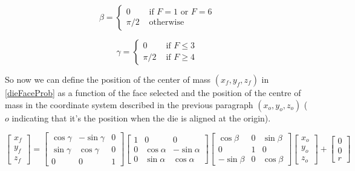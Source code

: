 \documentclass[english,12pt,a4paper,final]{article}
\begin{document}
\begin{equation*}
	\beta = \begin{cases} 
		0 & \text{ if } F = 1 \text{ or } F = 6 \\
		\pi/2 & \text{ otherwise }
	\end{cases}
\end{equation*}

\begin{equation*}
	\gamma = \begin{cases} 
		0 & \text{ if } F \le 3 \\
		\pi/2 & \text{ if } F \ge 4
	\end{cases}
\end{equation*}	

So now we can define the position of the center of mass $(x_f, y_f, z_f)$ in \eqref{dieFaceProb} as a function of the face selected and the position of the centre of mass in the coordinate system described in the previous paragraph $(x_o, y_o, z_o)$ ($o$ indicating that it's the position when the die is aligned at the origin).

\begin{equation*}
	\begin{bmatrix}
		x_f \\ y_f \\ z_f
	\end{bmatrix}
	=
	\begin{bmatrix}
		\cos\gamma & -\sin\gamma & 0 \\
		\sin\gamma & \cos\gamma & 0 \\
		0 & 0 & 1
	\end{bmatrix}
	\begin{bmatrix}
		1 & 0 & 0 \\
		0 & \cos\alpha & -\sin\alpha \\
		0 & \sin\alpha & \cos\alpha
	\end{bmatrix}
	\begin{bmatrix}
		\cos\beta & 0 & \sin\beta \\
		0 & 1 & 0 \\
		-\sin\beta & 0 & \cos\beta
	\end{bmatrix}
	\begin{bmatrix}
		x_o \\ y_o \\ z_o
	\end{bmatrix}
	 +
	 \begin{bmatrix}
	 	0 \\ 0 \\ r
	 \end{bmatrix}
\end{equation*}
\end{document}
